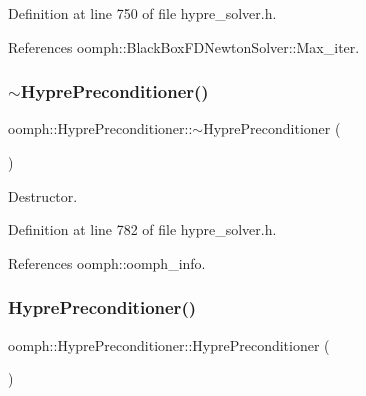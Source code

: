 Definition at line 750 of file hypre\+\_\+solver.\+h.



References oomph\+::\+Black\+Box\+F\+D\+Newton\+Solver\+::\+Max\+\_\+iter.

\mbox{\label{classoomph_1_1HyprePreconditioner_a024286a123aee3db8b06db9f0c97bbf0}} 
\subsubsection{\texorpdfstring{$\sim$\+Hypre\+Preconditioner()}{~HyprePreconditioner()}}
{\footnotesize\ttfamily oomph\+::\+Hypre\+Preconditioner\+::$\sim$\+Hypre\+Preconditioner (\begin{DoxyParamCaption}{ }\end{DoxyParamCaption})\hspace{0.3cm}{\ttfamily [inline]}}



Destructor. 



Definition at line 782 of file hypre\+\_\+solver.\+h.



References oomph\+::oomph\+\_\+info.

\mbox{\label{classoomph_1_1HyprePreconditioner_aca5c97a9cc1e7eac7dae52ca7dd89801}} 
\subsubsection{\texorpdfstring{Hypre\+Preconditioner()}{HyprePreconditioner()}\hspace{0.1cm}{\footnotesize\ttfamily [2/2]}}
{\footnotesize\ttfamily oomph\+::\+Hypre\+Preconditioner\+::\+Hypre\+Preconditioner (\begin{DoxyParamCaption}\item[{const \hyperlink{classoomph_1_1HyprePreconditioner}{Hypre\+Preconditioner} \&}]{ }\end{DoxyParamCaption})\hspace{0.3cm}{\ttfamily [inline]}}



